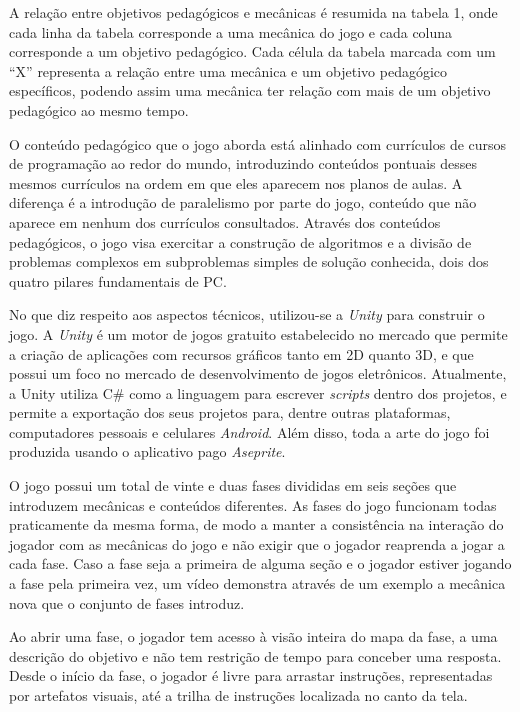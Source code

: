 \documentclass[conference]{IEEEtran}
\begin{document}


A relação entre objetivos pedagógicos e mecânicas é resumida na tabela 1, onde cada linha da tabela corresponde a uma mecânica do jogo e cada coluna corresponde a um objetivo pedagógico. Cada célula da tabela marcada com um ``X'' representa a relação entre uma mecânica e um objetivo pedagógico específicos, podendo assim uma mecânica ter relação com mais de um objetivo pedagógico ao mesmo tempo.

O conteúdo pedagógico que o jogo aborda está alinhado com currículos de cursos de programação ao redor do mundo\cite{tch060}\cite{govuk}, introduzindo conteúdos pontuais desses mesmos currículos na ordem em que eles aparecem nos planos de aulas. A diferença é a introdução de paralelismo por parte do jogo, conteúdo que não aparece em nenhum dos currículos consultados. Através dos conteúdos pedagógicos, o jogo visa exercitar a construção de algoritmos e a divisão de problemas complexos em subproblemas simples de solução conhecida, dois dos quatro pilares fundamentais de PC\cite{BBC}.

No que diz respeito aos aspectos técnicos, utilizou-se a \textit{Unity}\cite{unity} para construir o jogo. A \textit{Unity} é um motor de jogos gratuito estabelecido no mercado que permite a criação de aplicações com recursos gráficos tanto em 2D quanto 3D, e que possui um foco no mercado de desenvolvimento de jogos eletrônicos. Atualmente, a Unity utiliza C\#\cite{wagner_documentacao_nodate} como a linguagem para escrever \textit{scripts} dentro dos projetos, e permite a exportação dos seus projetos para, dentre outras plataformas, computadores pessoais e celulares \textit{Android}. Além disso, toda a arte do jogo foi produzida usando o aplicativo pago \textit{Aseprite}\cite{aseprite}.

O jogo possui um total de vinte e duas fases divididas em seis seções que introduzem mecânicas e conteúdos diferentes. As fases do jogo funcionam todas praticamente da mesma forma, de modo a manter a consistência na interação do jogador com as mecânicas do jogo e não exigir que o jogador reaprenda a jogar a cada fase. Caso a fase seja a primeira de alguma seção e o jogador estiver jogando a fase pela primeira vez, um vídeo demonstra através de um exemplo a mecânica nova que o conjunto de fases introduz.

Ao abrir uma fase, o jogador tem acesso à visão inteira do mapa da fase, a uma descrição do objetivo e não tem restrição de tempo para conceber uma resposta. Desde o início da fase, o jogador é livre para arrastar instruções, representadas por artefatos visuais, até a trilha de instruções localizada no canto da tela.
\end{document}
